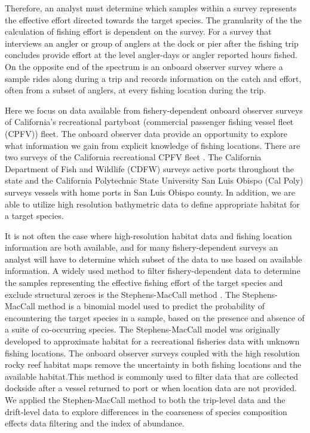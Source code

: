 \documentclass[
  12pt,
  authoryear,
  preprint,
  3p]{elsarticle}
\begin{document}
Therefore, an analyst must determine which samples within a survey
represents the effective effort directed towards the target species. The
granularity of the the calculation of fishing effort is dependent on the
survey. For a survey that interviews an angler or group of anglers at
the dock or pier after the fishing trip concludes provide effort at the
level angler-days or angler reported hours fished. On the opposite end
of the spectrum is an onboard observer survey where a sample rides along
during a trip and records information on the catch and effort, often
from a subset of anglers, at every fishing location during the trip.

Here we focus on data available from fishery-dependent onboard observer
surveys of California's recreational partyboat (commercial passenger
fishing vessel fleet (CPFV)) fleet. The onboard observer data provide an
opportunity to explore what information we gain from explicit knowledge
of fishing locations. There are two surveys of the California
recreational CPFV fleet \citep{Monk:2014:DRD}. The California Department
of Fish and Wildlife (CDFW) surveys active ports throughout the state
and the California Polytechnic State University San Luis Obispo (Cal
Poly) surveys vessels with home ports in San Luis Obispo county. In
addition, we are able to utilize high resolution bathymetric data to
define appropriate habitat for a target species.

It is not often the case where high-resolution habitat data and fishing
location information are both available, and for many fishery-dependent
surveys an analyst will have to determine which subset of the data to
use based on available information. A widely used method to filter
fishery-dependent data to determine the samples representing the
effective fishing effort of the target species and exclude structural
zeroes is the Stephens-MacCall method \citeyearpar{Stephens:2004:MAS}.
The Stephens-MacCall method is a binomial model used to predict the
probability of encountering the target species in a sample, based on the
presence and absence of a suite of co-occurring species. The
Stephens-MacCall model was originally developed to approximate habitat
for a recreational fisheries data with unknown fishing locations. The
onboard observer surveys coupled with the high resolution rocky reef
habitat maps remove the uncertainty in both fishing locations and the
available habitat.This method is commonly used to filter data that are
collected dockside after a vessel returned to port or when location data
are not provided. We applied the Stephen-MacCall method to both the
trip-level data and the drift-level data to explore differences in the
coarseness of species composition effects data filtering and the index
of abundance.
\end{document}
